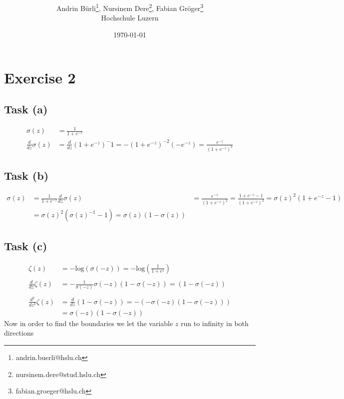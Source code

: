 \documentclass[onecolumn]{article}
\title{\spacecaps{Lab report: SW02}\\ \normalsize \spacesc{TSM\_DeLearn} }
\author{Andrin Bürli\thanks{andrin.buerli@hslu.ch}, Nursinem Dere\thanks{nursinem.dere@stud.hslu.ch}, Fabian Gröger\thanks{fabian.groeger@hslu.ch}\\Hochschule Luzern}
\date{\today}
\begin{document}
\maketitle

\section{Exercise 2}

\subsection{Task (a)}

\[
\begin{aligned}
	\sigma(z)&=\frac{1}{1+e^{-z}}\\
	\frac{d}{dz} \sigma(z) &= \frac{d}{dz}(1+e^{-z})^-1=-(1+e^{-z})^{-2}(-e^{-z})=\frac{e^{-z}}{(1+e^{-z})^{2}}
\end{aligned}
\]

\subsection{Task (b)}

\[
\begin{aligned}
	\sigma(z)&=\frac{1}{1+e^{-z}}
	\frac{d}{dz} \sigma(z) &= \frac{e^{-z}}{(1+e^{-z})^{2}}=\frac{1+e^{-z}-1}{(1+e^{-z})^{2}}=\sigma(z)^2(1+e^{-z}-1)\\
	&=\sigma(z)^2(\sigma(z)^{-1}-1)=\sigma(z)(1-\sigma(z))
\end{aligned}
\]

\subsection{Task (c)}

\[
\begin{aligned}
	\zeta(z)&=-\text{log}(\sigma(-z))=-\text{log}\left(\frac{1}{1+e^z}\right)\\
	\\
	\frac{d}{dz} \zeta(z) &= -\frac{1}{\sigma(-z)} \sigma(-z)(1-\sigma(-z)) = (1-\sigma(-z)) \\
	\\
	\frac{d^2}{dz^2} \zeta(z) &=\frac{d}{dz} (1-\sigma(-z))=-(-\sigma(-z)(1-\sigma(-z)))\\
	&=\sigma(-z)(1-\sigma(-z))
\end{aligned}
\]
Now in order to find the boundaries we let the variable $z$ run to infinity in both directions
\end{document}
